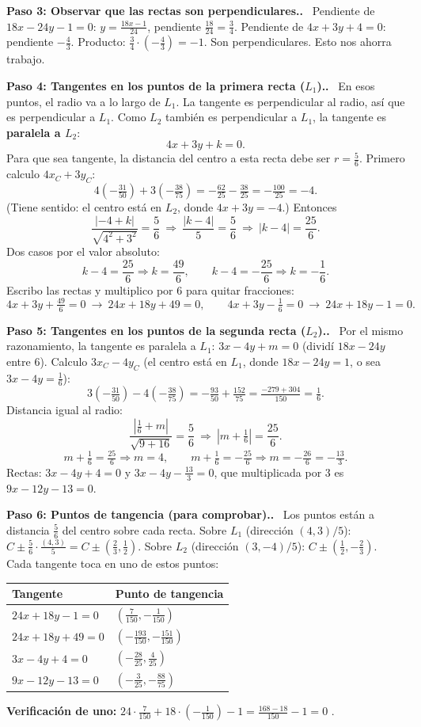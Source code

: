 \documentclass[11pt,a4paper]{article}
\newcommand{\paso}[1]{\par\medskip\noindent\textbf{\textcolor{blue!50!black}{Paso #1.}}\ }
\begin{document}
\paso{3: Observar que las rectas son perpendiculares.}
Pendiente de $18x-24y-1=0$: $y=\frac{18x-1}{24}$, pendiente $\frac{18}{24}=\frac34$.
Pendiente de $4x+3y+4=0$: pendiente $-\frac43$.
Producto: $\frac34\cdot\left(-\frac43\right)=-1$. Son perpendiculares. Esto nos ahorra trabajo.

\paso{4: Tangentes en los puntos de la primera recta ($L_1$).}
En esos puntos, el radio va a lo largo de $L_1$. La tangente es perpendicular al radio, así que es perpendicular a $L_1$.
Como $L_2$ también es perpendicular a $L_1$, la tangente es \textbf{paralela a $L_2$}:
\[ 4x+3y+k=0. \]
Para que sea tangente, la distancia del centro a esta recta debe ser $r=\frac56$. Primero calculo $4x_C+3y_C$:
\[ 4\left(-\tfrac{31}{50}\right)+3\left(-\tfrac{38}{75}\right)=-\tfrac{62}{25}-\tfrac{38}{25}=-\tfrac{100}{25}=-4. \]
(Tiene sentido: el centro está en $L_2$, donde $4x+3y=-4$.) Entonces
\[ \frac{|-4+k|}{\sqrt{4^2+3^2}}=\frac56\ \Rightarrow\ \frac{|k-4|}{5}=\frac56\ \Rightarrow\ |k-4|=\frac{25}{6}. \]
Dos casos por el valor absoluto:
\[ k-4=\frac{25}6\Rightarrow k=\frac{49}6,\qquad k-4=-\frac{25}6\Rightarrow k=-\frac16. \]
Escribo las rectas y multiplico por $6$ para quitar fracciones:
\[ 4x+3y+\tfrac{49}{6}=0\ \to\ 24x+18y+49=0,\qquad 4x+3y-\tfrac16=0\ \to\ 24x+18y-1=0. \]

\paso{5: Tangentes en los puntos de la segunda recta ($L_2$).}
Por el mismo razonamiento, la tangente es paralela a $L_1$: $3x-4y+m=0$ (dividí $18x-24y$ entre $6$).
Calculo $3x_C-4y_C$ (el centro está en $L_1$, donde $18x-24y=1$, o sea $3x-4y=\frac16$):
\[ 3\left(-\tfrac{31}{50}\right)-4\left(-\tfrac{38}{75}\right)=-\tfrac{93}{50}+\tfrac{152}{75}=\tfrac{-279+304}{150}=\tfrac16. \]
Distancia igual al radio:
\[ \frac{|\frac16+m|}{\sqrt{9+16}}=\frac56\ \Rightarrow\ \left|m+\tfrac16\right|=\frac{25}6. \]
\[ m+\tfrac16=\tfrac{25}6\Rightarrow m=4,\qquad m+\tfrac16=-\tfrac{25}6\Rightarrow m=-\tfrac{26}{6}=-\tfrac{13}3. \]
Rectas: $3x-4y+4=0$ y $3x-4y-\tfrac{13}3=0$, que multiplicada por $3$ es $9x-12y-13=0$.

\paso{6: Puntos de tangencia (para comprobar).}
Los puntos están a distancia $\frac56$ del centro sobre cada recta.
Sobre $L_1$ (dirección $(4,3)/5$): $C\pm\frac56\cdot\frac{(4,3)}5=C\pm\left(\frac23,\frac12\right)$.
Sobre $L_2$ (dirección $(3,-4)/5$): $C\pm\left(\frac12,-\frac23\right)$.
Cada tangente toca en uno de estos puntos:
\begin{center}
\begin{tabular}{ll}
\toprule
\textbf{Tangente} & \textbf{Punto de tangencia}\\ \midrule
$24x+18y-1=0$ & $\left(\frac7{150},-\frac1{150}\right)$\\
$24x+18y+49=0$ & $\left(-\frac{193}{150},-\frac{151}{150}\right)$\\
$3x-4y+4=0$ & $\left(-\frac{28}{25},\frac4{25}\right)$\\
$9x-12y-13=0$ & $\left(-\frac3{25},-\frac{88}{75}\right)$\\ \bottomrule
\end{tabular}
\end{center}
\textbf{Verificación de uno:} $24\cdot\frac7{150}+18\cdot\left(-\frac1{150}\right)-1=\frac{168-18}{150}-1=0$ \checkmark.
\end{document}
